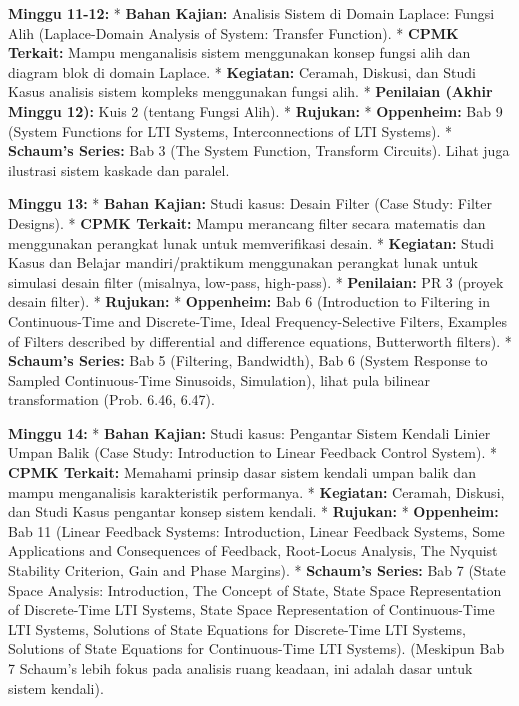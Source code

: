 \documentclass[
  letterpaper,
  DIV=11,
  numbers=noendperiod]{scrreprt}
\begin{document}
\textbf{Minggu 11-12:} * \textbf{Bahan Kajian:} Analisis Sistem di
Domain Laplace: Fungsi Alih (Laplace-Domain Analysis of System: Transfer
Function). * \textbf{CPMK Terkait:} Mampu menganalisis sistem
menggunakan konsep fungsi alih dan diagram blok di domain Laplace. *
\textbf{Kegiatan:} Ceramah, Diskusi, dan Studi Kasus analisis sistem
kompleks menggunakan fungsi alih. * \textbf{Penilaian (Akhir Minggu
12):} Kuis 2 (tentang Fungsi Alih). * \textbf{Rujukan:} *
\textbf{Oppenheim:} Bab 9 (System Functions for LTI Systems,
Interconnections of LTI Systems). * \textbf{Schaum's Series:} Bab 3 (The
System Function, Transform Circuits). Lihat juga ilustrasi sistem
kaskade dan paralel.

\textbf{Minggu 13:} * \textbf{Bahan Kajian:} Studi kasus: Desain Filter
(Case Study: Filter Designs). * \textbf{CPMK Terkait:} Mampu merancang
filter secara matematis dan menggunakan perangkat lunak untuk
memverifikasi desain. * \textbf{Kegiatan:} Studi Kasus dan Belajar
mandiri/praktikum menggunakan perangkat lunak untuk simulasi desain
filter (misalnya, low-pass, high-pass). * \textbf{Penilaian:} PR 3
(proyek desain filter). * \textbf{Rujukan:} * \textbf{Oppenheim:} Bab 6
(Introduction to Filtering in Continuous-Time and Discrete-Time, Ideal
Frequency-Selective Filters, Examples of Filters described by
differential and difference equations, Butterworth filters). *
\textbf{Schaum's Series:} Bab 5 (Filtering, Bandwidth), Bab 6 (System
Response to Sampled Continuous-Time Sinusoids, Simulation), lihat pula
bilinear transformation (Prob. 6.46, 6.47).

\textbf{Minggu 14:} * \textbf{Bahan Kajian:} Studi kasus: Pengantar
Sistem Kendali Linier Umpan Balik (Case Study: Introduction to Linear
Feedback Control System). * \textbf{CPMK Terkait:} Memahami prinsip
dasar sistem kendali umpan balik dan mampu menganalisis karakteristik
performanya. * \textbf{Kegiatan:} Ceramah, Diskusi, dan Studi Kasus
pengantar konsep sistem kendali. * \textbf{Rujukan:} *
\textbf{Oppenheim:} Bab 11 (Linear Feedback Systems: Introduction,
Linear Feedback Systems, Some Applications and Consequences of Feedback,
Root-Locus Analysis, The Nyquist Stability Criterion, Gain and Phase
Margins). * \textbf{Schaum's Series:} Bab 7 (State Space Analysis:
Introduction, The Concept of State, State Space Representation of
Discrete-Time LTI Systems, State Space Representation of Continuous-Time
LTI Systems, Solutions of State Equations for Discrete-Time LTI Systems,
Solutions of State Equations for Continuous-Time LTI Systems). (Meskipun
Bab 7 Schaum's lebih fokus pada analisis ruang keadaan, ini adalah dasar
untuk sistem kendali).
\end{document}
